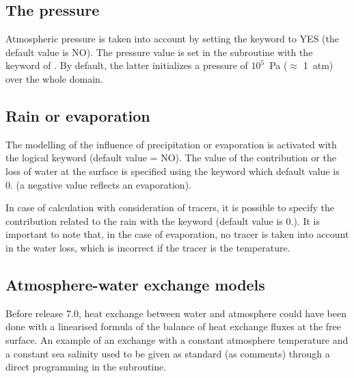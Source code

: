 


\subsection{The pressure}

Atmospheric pressure is taken into account by setting the keyword
 to YES (the default value is NO).
The pressure value is set in the  subroutine
with the keyword of .
By default, the latter initializes a pressure of $10^5$~Pa ($\approx$ 1~atm) over
the whole domain.


\subsection{Rain or evaporation}

The modelling of the influence of precipitation or evaporation is activated
with the logical keyword  (default value = NO).
The value of the
contribution or the loss of water at the surface is specified using the keyword
 which default value is 0. (a
negative value reflects an evaporation).

In case of calculation with consideration of tracers, it is possible to specify
the contribution related to the rain with the keyword  (default value is 0.). It is important to note that, in the case
of evaporation, no tracer is taken into account in the water loss, which is
incorrect if the tracer is the temperature.

\subsection{Atmosphere-water exchange models}

Before release 7.0, heat exchange between water and atmosphere could have been
done with a linearised formula of the balance of heat exchange fluxes at the
free surface. An example of an exchange with a constant atmosphere temperature
and a constant sea salinity used to be given as standard (as comments) through a
direct programming in the  subroutine.

